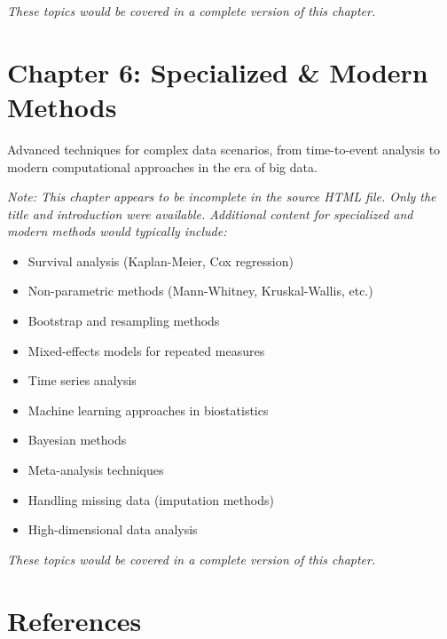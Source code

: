 \documentclass[
  11pt,
  letterpaper,
  oneside]{book}
\providecommand{\tightlist}{%
  \setlength{\itemsep}{0pt}\setlength{\parskip}{0pt}}\usepackage{longtable,booktabs,array}
\newlength{\cslhangindent}
\newenvironment{CSLReferences}[2] %
 {\begin{list}{}{%
  \setlength{\itemindent}{0pt}
  \setlength{\leftmargin}{0pt}
  \setlength{\parsep}{0pt}
  \ifodd #1
   \setlength{\leftmargin}{\cslhangindent}
   \setlength{\itemindent}{-1\cslhangindent}
  \fi
  \setlength{\itemsep}{#2\baselineskip}}}
 {\end{list}}
\begin{document}
\emph{These topics would be covered in a complete version of this
chapter.}


\chapter{Chapter 6: Specialized \& Modern
Methods}\label{chapter-6-specialized-modern-methods}

Advanced techniques for complex data scenarios, from time-to-event
analysis to modern computational approaches in the era of big data.

\emph{Note: This chapter appears to be incomplete in the source HTML
file. Only the title and introduction were available. Additional content
for specialized and modern methods would typically include:}

\begin{itemize}
\tightlist
\item
  Survival analysis (Kaplan-Meier, Cox regression)
\item
  Non-parametric methods (Mann-Whitney, Kruskal-Wallis, etc.)
\item
  Bootstrap and resampling methods
\item
  Mixed-effects models for repeated measures
\item
  Time series analysis
\item
  Machine learning approaches in biostatistics
\item
  Bayesian methods
\item
  Meta-analysis techniques
\item
  Handling missing data (imputation methods)
\item
  High-dimensional data analysis
\end{itemize}

\emph{These topics would be covered in a complete version of this
chapter.}


\chapter*{References}\label{references}


\label{refs}
\begin{CSLReferences}{0}{1}
\end{CSLReferences}
\end{document}

